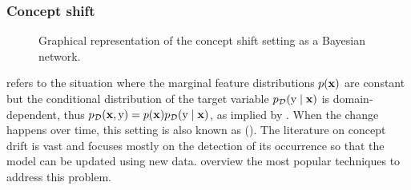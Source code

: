 \subsubsection{Concept shift}
\label{sec:concept_shift_sota}
\begin{figure}
    \centering
    \caption{Graphical representation of the concept shift setting as a Bayesian network.}
    \label{fig:concept_shift}
\end{figure}
 refers to the situation where the marginal feature distributions $p({\mathbf{x}})$ are constant but the conditional distribution of the target variable $p_{{\mathcal{D}}}({\textnormal{y}} \mid {\mathbf{x}})$ is domain-dependent, thus $p_{{\mathcal{D}}}({\mathbf{x}}, {\textnormal{y}}) = p({\mathbf{x}})p_{{\mathcal{D}}}({\textnormal{y}} \mid {\mathbf{x}})$, as implied by . When the change happens over time, this setting is also known as  (\citet{Webb2018}). The literature on concept drift is vast and focuses mostly on the detection of its occurrence so that the model can be updated using new data. \citet{Gama2014} overview the most popular techniques to address this problem.

